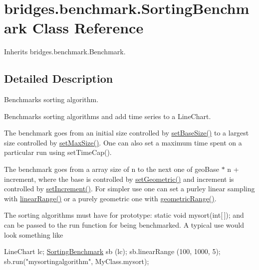 \hypertarget{classbridges_1_1benchmark_1_1_sorting_benchmark}{}\section{bridges.\+benchmark.\+Sorting\+Benchmark Class Reference}
\label{classbridges_1_1benchmark_1_1_sorting_benchmark}


Inherits bridges.\+benchmark.\+Benchmark.



\subsection{Detailed Description}
Benchmarks sorting algorithm. 

Benchmarks sorting algorithms and add time series to a Line\+Chart.

The benchmark goes from an initial size controlled by \mbox{\hyperlink{classbridges_1_1benchmark_1_1_sorting_benchmark_a7365a3586a08a0301ee90419a57c7aa3}{set\+Base\+Size()}} to a largest size controlled by \mbox{\hyperlink{classbridges_1_1benchmark_1_1_sorting_benchmark_a62db485e1a96afce2eed758e6e65555c}{set\+Max\+Size()}}. One can also set a maximum time spent on a particular run using set\+Time\+Cap().

The benchmark goes from a array size of n to the next one of geo\+Base $\ast$ n + increment, where the base is controlled by \mbox{\hyperlink{classbridges_1_1benchmark_1_1_sorting_benchmark_ab6871c77ec75cc58225497a8a9f45a90}{set\+Geometric()}} and increment is controlled by \mbox{\hyperlink{classbridges_1_1benchmark_1_1_sorting_benchmark_a1a44c5c6d5db47a26c6a801d71d85b58}{set\+Increment()}}. For simpler use one can set a purley linear sampling with \mbox{\hyperlink{classbridges_1_1benchmark_1_1_sorting_benchmark_a2d68f3078ea820485a9e802a5b17d3d6}{linear\+Range()}} or a purely geometric one with \mbox{\hyperlink{classbridges_1_1benchmark_1_1_sorting_benchmark_abc089e72c37b77a78f93e374e430ce60}{geometric\+Range()}}.

The sorting algorithms must have for prototype\+: static void mysort(int\mbox{[}$\,$\mbox{]}); and can be passed to the run function for being benchmarked. A typical use would look something like


\begin{DoxyCode}
LineChart lc;
\mbox{\hyperlink{classbridges_1_1benchmark_1_1_sorting_benchmark_aac0afefefe7762d001f47820dba2ed21}{SortingBenchmark}} sb (lc);
sb.linearRange (100, 1000, 5);
sb.run(\textcolor{stringliteral}{"mysortingalgorithm"}, MyClass.mysort);
\end{DoxyCode}


